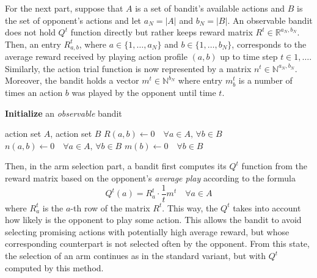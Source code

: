 \documentclass[../main.tex]{subfiles}
\begin{document}
For the next part, suppose that $A$ is a set of bandit's available actions and $B$ is the set of opponent's actions and let $a_N = |A|$ and $b_N = |B|$.
An observable bandit does not hold $Q^t$ function directly but rather keeps reward matrix $R^t \in \mathbb{R}^{a_N, b_N}$.
Then, an entry $R^t_{a,b}$, where $a \in \{1, \dots, a_N\}$ and $b \in \{1, \dots, b_N\}$, corresponds to the average reward received by playing action profile $(a, b)$ up to time step $t \in 1, \dots$.
Similarly, the action trial function is now represented by a matrix $n^t \in \mathbb{N}^{a_N, b_N}$.
Moreover, the bandit holds a vector $m^t \in \mathbb{N}^{b_N}$ where entry $m^t_b$ is a number of times an action $b$ was played by the opponent until time $t$.

\begin{algorithm}
    \caption{\textbf{Initialize} an \textit{observable} bandit}
    \label{new:bandit:obs:init}
    \begin{algorithmic}[1]
        \Require action set $A$, action set $B$
        \State $R(a, b) \leftarrow 0 \quad \forall a \in A, \, \forall b \in B$
        \State $n(a, b) \leftarrow 0 \quad \forall a \in A, \, \forall b \in B$
        \State $m(b) \leftarrow 0 \quad \forall b \in B$
    \end{algorithmic}
\end{algorithm}

Then, in the arm selection part, a bandit first computes its $Q^t$ function from the reward matrix based on the opponent's \textit{average play} according to the formula
\begin{equation}\label{new:bandit:obs:avgplay}
    Q^t(a) = R^{t}_{a} \cdot \frac{1}{t} m^t \quad \forall a \in A
\end{equation}
where $R^{t}_{a}$ is the $a$-th row of the matrix $R^t$.
This way, the $Q^t$ takes into account how likely is the opponent to play some action.
This allows the bandit to avoid selecting promising actions with potentially high average reward, but whose corresponding counterpart is not selected often by the opponent.
From this state, the selection of an arm continues as in the standard variant, but with $Q^t$ computed by this method.
\end{document}
